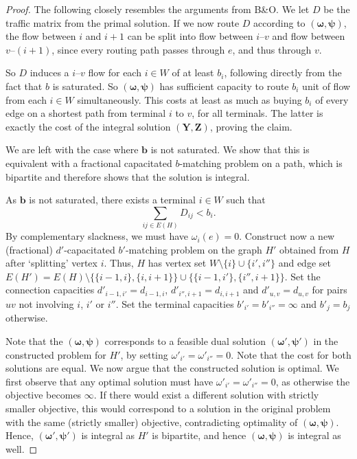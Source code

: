 \documentclass[11pt]{article}
\begin{document}
\begin{proof}
        The following closely resembles the arguments from B\&O\@.
        We let $D$ be the traffic matrix from the primal solution.
        If we now route $D$ according to $(\boldsymbol \omega, \boldsymbol \psi)$, the flow between $i$ and $i+1$ can be split into flow between $i$--$v$ and flow between $v$--$(i+1)$, since every routing path passes through $e$, and thus through $v$.

        So $D$ induces a $i$--$v$ flow for each $i \in W$ of at least $b_i$, following directly from the fact that $b$ is saturated.
        So $(\boldsymbol \omega, \boldsymbol \psi)$ has sufficient capacity to route $b_i$ unit of flow from each $i \in W$ simultaneously.
        This costs at least as much as buying $b_i$ of every edge on a shortest path from terminal $i$ to $v$, for all terminals.
        The latter is exactly the cost of the integral solution $(\boldsymbol Y, \boldsymbol Z)$, proving the claim.

        We are left with the case where $\boldsymbol b$ is not saturated.
        We show that this is equivalent with a fractional capacitated $b$-matching problem on a path, which is bipartite and therefore shows that the solution is integral.

        As $\boldsymbol b$ is not saturated, there exists a terminal $i \in W$ such that
        \[
            \sum_{ij \in E(H)} D_{ij} < b_i.
        \]
        By complementary slackness, we must have $\omega_i(e) = 0$.
        Construct now a new (fractional) $d'$-capacitated $b'$-matching problem on the graph $H'$ obtained from $H$ after `splitting' vertex $i$.
        Thus, $H$ has vertex set $W\setminus \{i\} \cup \{i', i''\}$ and edge set $E(H') = E(H) \setminus \{ \{i-1,i\}, \{i, i+1\} \} \cup \{ \{i-1, i'\}, \{i'', i+1\} \}$.
        Set the connection capacities $d'_{i-1,i'} = d_{i-1,i}$, $d'_{i'',i+1} = d_{i,i+1}$ and $d'_{u,v} = d_{u,v}$ for pairs $uv$ not involving $i$, $i'$ or $i''$.
        Set the terminal capacities $b'_{i'} = b'_{i''} = \infty$ and $b'_j = b_j$ otherwise.

        Note that the $(\boldsymbol \omega, \boldsymbol \psi)$ corresponds to a feasible dual solution $(\boldsymbol \omega', \boldsymbol \psi')$ in the constructed problem for $H'$, by setting $\omega'_{i'} = \omega'_{i''} = 0$.
        Note that the cost for both solutions are equal.
        We now argue that the constructed solution is optimal.
        We first observe that any optimal solution must have $\omega'_{i'} = \omega'_{i''} = 0$, as otherwise the objective becomes $\infty$.
        If there would exist a different solution with strictly smaller objective, this would correspond to a solution in the original problem with the same (strictly smaller) objective, contradicting optimality of $(\boldsymbol \omega, \boldsymbol \psi)$.
        Hence, $(\boldsymbol \omega', \boldsymbol \psi')$ is integral as $H'$ is bipartite, and hence $(\boldsymbol \omega, \boldsymbol \psi)$ is integral as well.
    \end{proof}
\end{document}

